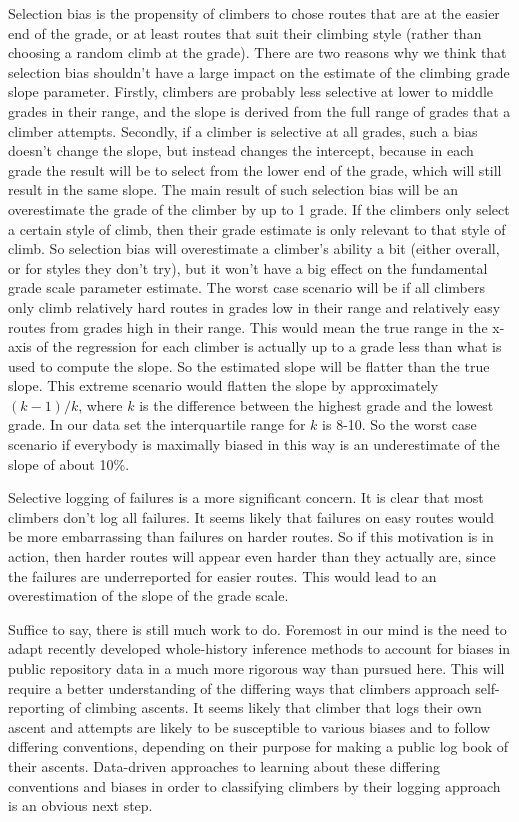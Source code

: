 \documentclass{article}
\begin{document}
Selection bias is the propensity of climbers to chose routes that are at the easier end of the grade, or at least routes that suit their climbing style (rather than choosing a random climb at the grade). There are two reasons why we think that selection bias shouldn't have a large impact on the estimate of the climbing grade slope parameter. Firstly, climbers are probably less selective at lower to middle grades in their range, and the slope is derived from the full range of grades that a climber attempts. Secondly, if a climber is selective at all grades, such a bias doesn't change the slope, but instead changes the intercept, because in each grade the result will be to select from the lower end of the grade, which will still result in the same slope. The main result of such selection bias will be an overestimate the grade of the climber by up to 1 grade. If the climbers only select a certain style of climb, then their grade estimate is only relevant to that style of climb. So selection bias will overestimate a climber's ability a bit (either overall, or for styles they don't try), but it won't have a big effect on the fundamental grade scale parameter estimate. The worst case scenario will be if all climbers only climb relatively hard routes in grades low in their range and relatively easy routes from grades high in their range. This would mean the true range in the x-axis of the regression for each climber is actually up to a grade less than what is used to compute the slope. So the estimated slope will be flatter than the true slope. This extreme scenario would flatten the slope by approximately $(k-1)/k$, where $k$ is the difference between the highest grade and the lowest grade. In our data set the interquartile range for $k$ is 8-10. So the worst case scenario if everybody is maximally biased in this way is an underestimate of the slope of about 10\%.  

Selective logging of failures is a more significant concern. It is clear that most climbers don't log all failures. It seems likely that failures on easy routes would be more embarrassing than failures on harder routes. So if this motivation is in action, then harder routes will appear even harder than they actually are, since the failures are underreported for easier routes. This would lead to an overestimation of the slope of the grade scale.

Suffice to say, there is still much work to do. Foremost in our mind is the need to adapt recently developed whole-history inference methods to account for biases in public repository data in a much more rigorous way than pursued here. This will require a better understanding of the differing ways that climbers approach self-reporting of climbing ascents. It seems likely that climber that logs their own ascent and attempts are likely to be susceptible to various biases and to follow differing conventions, depending on their purpose for making a public log book of their ascents. Data-driven approaches to learning about these differing conventions and biases in order to classifying climbers by their logging approach is an obvious next step.
\end{document}
